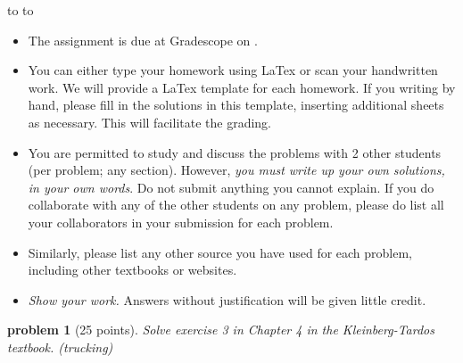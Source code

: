 \documentclass[10pt]{article}
\newcommand{\handout}{
   \renewcommand{\thepage}{H\hnumber-\arabic{page}}
   \noindent
   \begin{center}
      \vbox{
    \hbox to \columnwidth {\sc{\course} --- \prof \hfill}
    \vspace{-2mm}
    \hbox to \columnwidth {\sc due \MakeLowercase{\duedate} \duelocation\hfill {\Huge\color{mdb}H\hnumber.\yourname}}
      }
   \end{center}
   \vspace*{2mm}
}
\newtheorem{problem}{\sc\color{cit}problem}
\begin{document}
\handout
\begin{itemize}
\item The assignment is due at Gradescope on \duedate. 

\item You can either type your homework using LaTex or scan your handwritten work. We will provide a LaTex template for each homework. If you writing by hand, please fill in the solutions in this template, inserting additional sheets as necessary. This will facilitate the grading.

\item You are permitted to study and discuss the problems with 2 other students (per problem; any section).  However, {\em you must write up your own solutions, in your own words}. Do not submit anything you cannot explain. If you do collaborate with any of the other students on any problem, please do list all your collaborators in your submission for each problem. 

\item Similarly, please list any other source you have used for each problem, including other textbooks or websites.


\item {\em Show your work.} Answers without justification will be given little credit.
\end{itemize}


\newpage
\begin{problem}[25 points]
Solve exercise 3 in Chapter 4 in the Kleinberg-Tardos textbook.  (trucking)
\end{problem}
\end{document}
